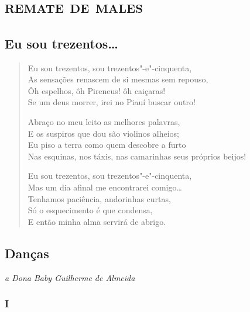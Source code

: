 \paginabranca
{}
\part{\textsc{remate de males}}
\removeepigraph


\chapter[Eu sou trezentos\ldots{}]{Eu sou trezentos\ldots{} }

\begin{verse}
Eu sou trezentos, sou trezentos"-e"-cinquenta,\\
As sensações renascem de si mesmas sem repouso,\\
Ôh espelhos, ôh Pireneus! ôh caiçaras!\\
Se um deus morrer, irei no Piauí buscar outro!

Abraço no meu leito as melhores palavras,\\
E os suspiros que dou são violinos alheios;\\
Eu piso a terra como quem descobre a furto\\
Nas esquinas, nos táxis, nas camarinhas seus próprios beijos!

Eu sou trezentos, sou trezentos"-e"-cinquenta,\\
Mas um dia afinal me encontrarei comigo\ldots{}\\
Tenhamos paciência, andorinhas curtas,\\
Só o esquecimento é que condensa,\\
E então minha alma servirá de abrigo.
\end{verse}

\chapter[Danças]{Danças }


\begin{flushright}
\emph{a Dona Baby Guilherme de Almeida}
\end{flushright}

\section*{I}

